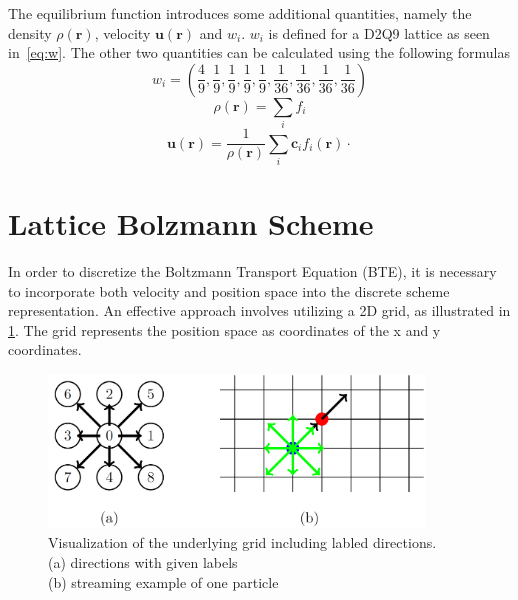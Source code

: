 The equilibrium function introduces some additional quantities, namely the density \(\rho(\mathbf{r})\), velocity \(\mathbf{u}(\mathbf{r})\) and \(w_i\).
\(w_i\) is defined for a D2Q9 lattice as seen in~\cref{eq:w}.
The other two quantities can be calculated using the following formulas
\begin{equation}
    w_i = \left(\dfrac{4}{9},
    \dfrac{1}{9}, \dfrac{1}{9}, \dfrac{1}{9}, \dfrac{1}{9},
    \dfrac{1}{36}, \dfrac{1}{36}, \dfrac{1}{36}, \dfrac{1}{36}\right)
    \label{eq:w}
\end{equation}
\begin{equation}
    \rho(\mathbf{r})=\sum_i f_i
    \label{eq:rho}
\end{equation}
\begin{equation}
    \mathbf{u}(\mathbf{r})=
    \frac{1}{\rho(\mathbf{r})}\sum_i \mathbf{c}_i f_i(\mathbf{r}) \cdot
    \label{eq:u}
\end{equation}


\section{Lattice Bolzmann Scheme}\label{sec:lattice-bolzmann-scheme}

In order to discretize the Boltzmann Transport Equation (BTE), it is necessary to incorporate both velocity and position space into the discrete scheme representation.
An effective approach involves utilizing a 2D grid, as illustrated in \cref{fig:bte-scheme}.
The grid represents the position space as coordinates of the x and y coordinates.

\begin{figure}[H]
    \begin{center}
        \includegraphics[width=10cm]{logos/Gitter_LBM.png}
        \caption[Visualization of the underlying grid including labled directions.]{
            Visualization of the underlying grid including labled directions. \\
            (a) directions with given labels \\
            (b) streaming example of one particle
        }
        \label{fig:bte-scheme}
    \end{center}
\end{figure}

